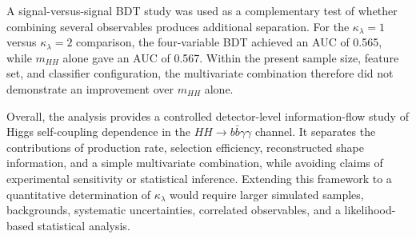 \documentclass[11pt,a4paper]{article}
\begin{document}
A signal-versus-signal BDT study was used as a complementary test of whether combining several observables produces additional separation. For the $\kappa_\lambda=1$ versus $\kappa_\lambda=2$ comparison, the four-variable BDT achieved an AUC of 0.565, while $m_{HH}$ alone gave an AUC of 0.567. Within the present sample size, feature set, and classifier configuration, the multivariate combination therefore did not demonstrate an improvement over $m_{HH}$ alone.

Overall, the analysis provides a controlled detector-level information-flow study of Higgs self-coupling dependence in the $HH\to b\bar b\gamma\gamma$ channel. It separates the contributions of production rate, selection efficiency, reconstructed shape information, and a simple multivariate combination, while avoiding claims of experimental sensitivity or statistical inference. Extending this framework to a quantitative determination of $\kappa_\lambda$ would require larger simulated samples, backgrounds, systematic uncertainties, correlated observables, and a likelihood-based statistical analysis.



\end{document}
